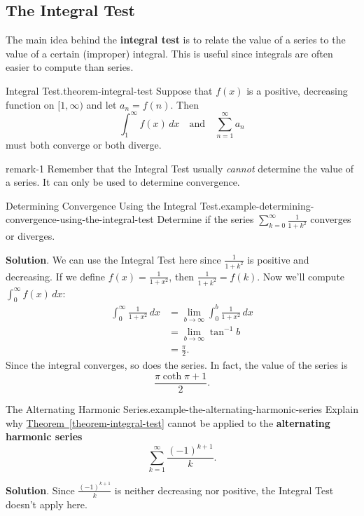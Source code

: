\documentclass[10pt,]{book}
\newcommand{\terminology}[1]{\textbf{#1}}
\numberwithin{equation}{section}
\newcommand{\amp}{&}
\begin{document}
\subsection[{The Integral Test}]{The Integral Test}\label{subsection-the-integral-test}
\hypertarget{p-872}{}%
The main idea behind the \terminology{integral test} is to relate the value of a series to the value of a certain (improper) integral. This is useful since integrals are often easier to compute than series.%
\begin{theorem}{Integral Test.}{}{theorem-integral-test}%
\hypertarget{p-873}{}%
Suppose that \(f(x)\) is a positive, decreasing function on \([1,\infty)\) and let \(a_{n} = f(n)\). Then%
\begin{equation*}
\int_{1}^{\infty}f(x)\,dx\quad\text{and}\quad \sum_{n=1}^{\infty}a_{n}
\end{equation*}
must both converge or both diverge.%
\end{theorem}
\begin{remark}{}{remark-1}%
\hypertarget{p-874}{}%
Remember that the Integral Test usually \emph{cannot} determine the value of a series. It can only be used to determine convergence.%
\end{remark}
\begin{example}{Determining Convergence Using the Integral Test.}{example-determining-convergence-using-the-integral-test}%
\hypertarget{p-875}{}%
Determine if the series \(\sum_{k=0}^{\infty}\frac{1}{1 + k^{2}}\) converges or diverges.%
\par\smallskip%
\noindent\textbf{Solution}.\hypertarget{solution-181}{}\quad%
\hypertarget{p-876}{}%
We can use the Integral Test here since \(\frac{1}{1 + k^{2}}\) is positive and decreasing. If we define \(f(x) = \frac{1}{1 + x^{2}}\), then \(\frac{1}{1 + k^{2}} = f(k)\). Now we'll compute \(\int_{0}^{\infty}f(x)\,dx\):%
\begin{align*}
\int_{0}^{\infty}\frac{1}{1 + x^{2}}\,dx \amp = \lim_{b\to\infty}\int_{0}^{b}\frac{1}{1 + x^{2}}\,dx \\
\amp = \lim_{b\to\infty}\tan^{-1}b \\
\amp = \frac{\pi}{2} \text{.}
\end{align*}
Since the integral converges, so does the series. In fact, the value of the series is%
\begin{equation*}
\frac{\pi\coth\pi + 1}{2}\text{.}
\end{equation*}
%
\end{example}
\begin{example}{The Alternating Harmonic Series.}{example-the-alternating-harmonic-series}%
\hypertarget{p-877}{}%
Explain why \hyperref[theorem-integral-test]{Theorem~\ref{theorem-integral-test}} cannot be applied to the \terminology{alternating harmonic series}%
\begin{equation*}
\sum_{k=1}^{\infty}\frac{(-1)^{k + 1}}{k}\text{.}
\end{equation*}
%
\par\smallskip%
\noindent\textbf{Solution}.\hypertarget{solution-182}{}\quad%
\hypertarget{p-878}{}%
Since \(\frac{(-1)^{k+1}}{k}\) is neither decreasing nor positive, the Integral Test doesn't apply here.%
\end{example}
\end{document}
